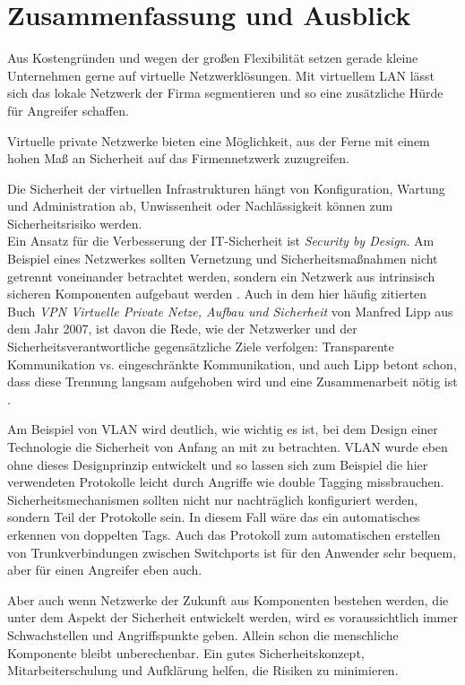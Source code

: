 \chapter{Zusammenfassung und Ausblick}

Aus Kostengründen und wegen der großen Flexibilität setzen gerade kleine Unternehmen gerne auf virtuelle Netzwerklösungen. Mit virtuellem LAN lässt sich das lokale Netzwerk der Firma segmentieren und so eine zusätzliche Hürde für Angreifer schaffen.

Virtuelle private Netzwerke bieten eine Möglichkeit, aus der Ferne mit einem hohen Maß an Sicherheit auf das Firmennetzwerk zuzugreifen. 

Die Sicherheit der virtuellen Infrastrukturen hängt von Konfiguration, Wartung und Administration ab, Unwissenheit oder Nachlässigkeit können zum Sicherheitsrisiko werden. \\   

Ein Ansatz für die Verbesserung der IT-Sicherheit ist \emph{Security by Design}. Am Beispiel eines Netzwerkes sollten Vernetzung und Sicherheitsmaßnahmen nicht getrennt voneinander betrachtet werden, sondern ein Netzwerk aus intrinsisch sicheren Komponenten aufgebaut werden \cite{nicholson2018blurring}. Auch in dem hier häufig zitierten Buch \emph{VPN Virtuelle Private Netze, Aufbau und Sicherheit} von Manfred Lipp aus dem Jahr 2007, ist davon die Rede, wie der Netzwerker und der Sicherheitsverantwortliche gegensätzliche Ziele verfolgen: Transparente Kommunikation vs. eingeschränkte Kommunikation, und auch Lipp betont schon, dass diese Trennung langsam aufgehoben wird und eine Zusammenarbeit nötig ist \cite{lipp2007vpn}. 

Am Beispiel von VLAN wird deutlich, wie wichtig es ist, bei dem Design einer Technologie die Sicherheit von Anfang an mit zu betrachten. VLAN wurde eben ohne dieses Designprinzip entwickelt und so lassen sich zum Beispiel die hier verwendeten Protokolle leicht durch Angriffe wie double Tagging missbrauchen. Sicherheitsmechanismen sollten nicht nur nachträglich konfiguriert werden, sondern Teil der Protokolle sein. In diesem Fall wäre das ein automatisches erkennen von doppelten Tags. Auch das Protokoll zum automatischen erstellen von Trunkverbindungen zwischen Switchports ist für den Anwender sehr bequem, aber für einen Angreifer eben auch. 

Aber auch wenn Netzwerke der Zukunft aus Komponenten bestehen werden, die unter dem Aspekt der Sicherheit entwickelt werden, %
wird es voraussichtlich immer Schwachstellen und Angriffspunkte geben. Allein schon die menschliche Komponente bleibt unberechenbar. Ein gutes Sicherheitskonzept, Mitarbeiterschulung und Aufklärung helfen, die Risiken zu minimieren.



